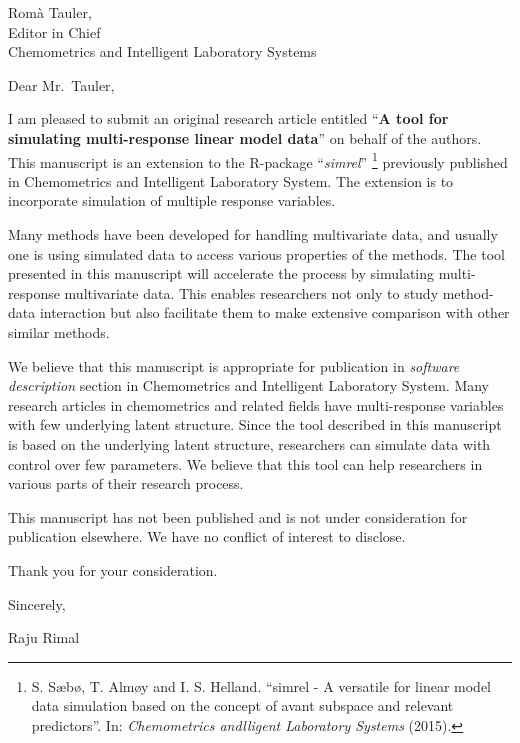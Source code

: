 \documentclass[11pt,a4paper,]{letter}
\date{July 25, 2017}
\begin{document}
\begin{letter}{Romà Tauler,\\Editor in Chief\\Chemometrics and Intelligent Laboratory Systems}
\opening{Dear Mr.~Tauler,}

I am pleased to submit an original research article entitled ``\textbf{A
tool for simulating multi-response linear model data}'' on behalf of the
authors. This manuscript is an extension to the R-package
``\emph{simrel}'' \footnote{S. Sæbø, T. Almøy and I. S. Helland.
  ``simrel - A versatile for linear model data simulation based on the
  concept of avant subspace and relevant predictors''. In:
  \emph{Chemometrics andlligent Laboratory Systems} (2015).} previously
published in Chemometrics and Intelligent Laboratory System. The
extension is to incorporate simulation of multiple response variables.

Many methods have been developed for handling multivariate data, and
usually one is using simulated data to access various properties of the
methods. The tool presented in this manuscript will accelerate the
process by simulating multi-response multivariate data. This enables
researchers not only to study method-data interaction but also
facilitate them to make extensive comparison with other similar methods.

We believe that this manuscript is appropriate for publication in
\emph{software description} section in Chemometrics and Intelligent
Laboratory System. Many research articles in chemometrics and related
fields have multi-response variables with few underlying latent
structure. Since the tool described in this manuscript is based on the
underlying latent structure, researchers can simulate data with control
over few parameters. We believe that this tool can help researchers in
various parts of their research process.

This manuscript has not been published and is not under consideration
for publication elsewhere. We have no conflict of interest to disclose.

Thank you for your consideration.

\longindentation=0pt
\closing{Sincerely,}
 \parbox[b]{0.3\textwidth}{Raju Rimal}

\end{letter}
\end{document}
